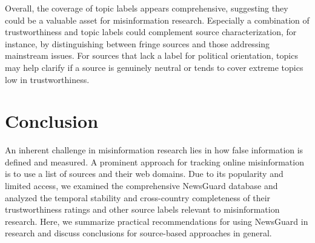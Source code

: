 \documentclass[12pt,twoside]{article}
\begin{document}
Overall, the coverage of topic labels appears comprehensive, suggesting they could be a valuable asset for misinformation research. 
Especially a combination of trustworthiness and topic labels could complement source characterization, for instance, by distinguishing between fringe sources and those addressing mainstream issues. 
For sources that lack a label for political orientation, topics may help clarify if a source is genuinely neutral or tends to cover extreme topics low in trustworthiness.

\section{Conclusion}
An inherent challenge in misinformation research lies in how false information is defined and measured. 
A prominent approach for tracking online misinformation is to use a list of sources and their web domains.
Due to its popularity and limited access, we examined the comprehensive NewsGuard database and analyzed the temporal stability and cross-country completeness of their trustworthiness ratings and other source labels relevant to misinformation research.
Here, we summarize practical recommendations for using NewsGuard in research and discuss conclusions for source-based approaches in general.
\end{document}
